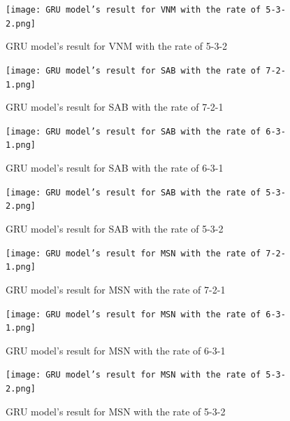 \documentclass{ieeeojies}
\begin{document}
    \begin{figure}[H]
    
    \begin{minipage}{0.23\textwidth}
    \centering
    \texttt{[image: GRU model’s result for VNM with the rate of 5-3-2.png]}
    \caption{GRU model’s result for VNM with the rate of 5-3-2}
    \end{minipage}   
   \hfill
    \centering
    \begin{minipage}{0.23\textwidth}
    \centering
    \texttt{[image: GRU model’s result for SAB with the rate of 7-2-1.png]}
    \caption{GRU model’s result for SAB with the rate of 7-2-1}
    \end{minipage}
     \end{figure}
     
     \begin{figure}[H]
    \begin{minipage}{0.23\textwidth}
    \centering
    \texttt{[image: GRU model’s result for SAB with the rate of 6-3-1.png]}
    \caption{GRU model’s result for SAB with the rate of 6-3-1}
    \end{minipage}
    \hfill
    \begin{minipage}{0.23\textwidth}
    \centering
    \texttt{[image: GRU model’s result for SAB with the rate of 5-3-2.png]}
    \caption{GRU model’s result for SAB with the rate of 5-3-2}
    \end{minipage}
    \end{figure}
    \begin{figure}[H]
    \begin{minipage}{0.23\textwidth}
    \centering
    \texttt{[image: GRU model’s result for MSN with the rate of 7-2-1.png]}
    \caption{GRU model’s result for MSN with the rate of 7-2-1}
    \end{minipage}   
    \hfill
    \begin{minipage}{0.23\textwidth}
    \centering
    \texttt{[image: GRU model’s result for MSN with the rate of 6-3-1.png]}
    \caption{GRU model’s result for MSN with the rate of 6-3-1}
    \end{minipage}
    \end{figure}
   \begin{figure}[H]

    \begin{minipage}{0.23\textwidth}
    \centering
    \texttt{[image: GRU model’s result for MSN with the rate of 5-3-2.png]}
    \caption{GRU model’s result for MSN with the rate of 5-3-2}
    \end{minipage}
    \end{figure}
\end{document}

